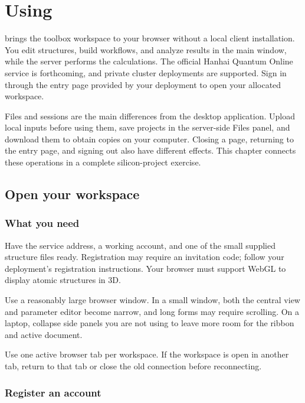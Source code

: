 \chapter{Using \headinglatin{\ksonline}}\label{ch:online}

\ksonline{} brings the toolbox workspace to your browser without a local client installation. You edit structures, build workflows, and analyze results in the main window, while the server performs the calculations. The official Hanhai Quantum\regmark{} Online service is forthcoming, and private cluster deployments are supported. Sign in through the entry page provided by your deployment to open your allocated workspace.

Files and sessions are the main differences from the desktop application. Upload local inputs before using them, save projects in the server-side Files panel, and download them to obtain copies on your computer. Closing a page, returning to the entry page, and signing out also have different effects. This chapter connects these operations in a complete silicon-project exercise.

\section{Open your workspace}

\subsection{What you need}

Have the service address, a working account, and one of the small supplied structure files ready. Registration may require an invitation code; follow your deployment's registration instructions. Your browser must support WebGL to display atomic structures in 3D.

Use a reasonably large browser window. In a small window, both the central view and parameter editor become narrow, and long forms may require scrolling. On a laptop, collapse side panels you are not using to leave more room for the ribbon and active document.

Use one active browser tab per workspace. If the workspace is open in another tab, return to that tab or close the old connection before reconnecting.

\subsection{Register an account}

